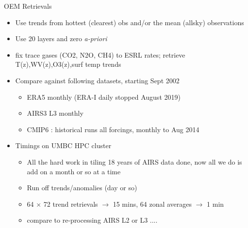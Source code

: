 \documentclass[10pt,t]{beamer}
\begin{document}
\begin{frame}{OEM Retrievals}
\begin{block}{}
\begin{itemize}

\item {\large Use trends from hottest (clearest) obs and/or the
      mean (allsky) observations}
\item Use 20 layers and zero \emph{a-priori}
\item fix trace gases (CO2, N2O, CH4) to ESRL rates; retrieve T(z),WV(z),O3(z),surf temp trends
\item Compare against following datasets, starting Sept 2002
  \begin{itemize}
  \item ERA5 monthly (ERA-I daily stopped August 2019)
  \item AIRS3 L3 monthly
  \item CMIP6 : historical runs all forcings, monthly to Aug 2014
  \end{itemize}
\item Timings on UMBC HPC cluster
  \begin{itemize}
    \item All the hard work in tiling 18 years of AIRS data done, now all we do is add on a month or so at a time
    \item Run off trends/anomalies (day or so)
    \item 64 $\times$ 72 trend retrievals $\rightarrow$ 15 mins, 64 zonal averages $\rightarrow$ 1 min
    \item compare to re-processing AIRS L2 or L3 ....
  \end{itemize}
\end{itemize}
\end{block}
\end{frame}
\end{document}
